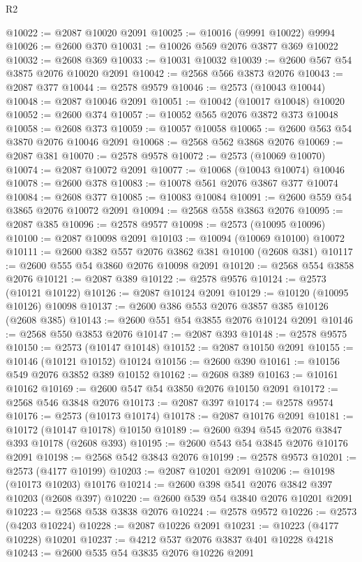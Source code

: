 \begin{lexlean}{R2}
\begin{coremodule}
@10022 := @2087 @10020 @2091
@10025 := @10016 (@9991 @10022) @9994
@10026 := @2600 @370
@10031 := @10026 @569 @2076 @3877 @369 @10022
@10032 := @2608 @369
@10033 := @10031 @10032
@10039 := @2600 @567 @54 @3875 @2076 @10020 @2091
@10042 := @2568 @566 @3873 @2076
@10043 := @2087 @377
@10044 := @2578 @9579
@10046 := @2573 (@10043 @10044)
@10048 := @2087 @10046 @2091
@10051 := @10042 (@10017 @10048) @10020
@10052 := @2600 @374
@10057 := @10052 @565 @2076 @3872 @373 @10048
@10058 := @2608 @373
@10059 := @10057 @10058
@10065 := @2600 @563 @54 @3870 @2076 @10046 @2091
@10068 := @2568 @562 @3868 @2076
@10069 := @2087 @381
@10070 := @2578 @9578
@10072 := @2573 (@10069 @10070)
@10074 := @2087 @10072 @2091
@10077 := @10068 (@10043 @10074) @10046
@10078 := @2600 @378
@10083 := @10078 @561 @2076 @3867 @377 @10074
@10084 := @2608 @377
@10085 := @10083 @10084
@10091 := @2600 @559 @54 @3865 @2076 @10072 @2091
@10094 := @2568 @558 @3863 @2076
@10095 := @2087 @385
@10096 := @2578 @9577
@10098 := @2573 (@10095 @10096)
@10100 := @2087 @10098 @2091
@10103 := @10094 (@10069 @10100) @10072
@10111 := @2600 @382 @557 @2076 @3862 @381 @10100 (@2608 @381)
@10117 := @2600 @555 @54 @3860 @2076 @10098 @2091
@10120 := @2568 @554 @3858 @2076
@10121 := @2087 @389
@10122 := @2578 @9576
@10124 := @2573 (@10121 @10122)
@10126 := @2087 @10124 @2091
@10129 := @10120 (@10095 @10126) @10098
@10137 := @2600 @386 @553 @2076 @3857 @385 @10126 (@2608 @385)
@10143 := @2600 @551 @54 @3855 @2076 @10124 @2091
@10146 := @2568 @550 @3853 @2076
@10147 := @2087 @393
@10148 := @2578 @9575
@10150 := @2573 (@10147 @10148)
@10152 := @2087 @10150 @2091
@10155 := @10146 (@10121 @10152) @10124
@10156 := @2600 @390
@10161 := @10156 @549 @2076 @3852 @389 @10152
@10162 := @2608 @389
@10163 := @10161 @10162
@10169 := @2600 @547 @54 @3850 @2076 @10150 @2091
@10172 := @2568 @546 @3848 @2076
@10173 := @2087 @397
@10174 := @2578 @9574
@10176 := @2573 (@10173 @10174)
@10178 := @2087 @10176 @2091
@10181 := @10172 (@10147 @10178) @10150
@10189 := @2600 @394 @545 @2076 @3847 @393 @10178 (@2608 @393)
@10195 := @2600 @543 @54 @3845 @2076 @10176 @2091
@10198 := @2568 @542 @3843 @2076
@10199 := @2578 @9573
@10201 := @2573 (@4177 @10199)
@10203 := @2087 @10201 @2091
@10206 := @10198 (@10173 @10203) @10176
@10214 := @2600 @398 @541 @2076 @3842 @397 @10203 (@2608 @397)
@10220 := @2600 @539 @54 @3840 @2076 @10201 @2091
@10223 := @2568 @538 @3838 @2076
@10224 := @2578 @9572
@10226 := @2573 (@4203 @10224)
@10228 := @2087 @10226 @2091
@10231 := @10223 (@4177 @10228) @10201
@10237 := @4212 @537 @2076 @3837 @401 @10228 @4218
@10243 := @2600 @535 @54 @3835 @2076 @10226 @2091

\end{coremodule}
\end{lexlean}
